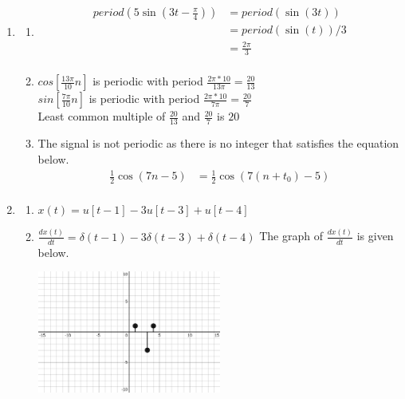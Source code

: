 \documentclass[10pt,a4paper, margin=1in]{article}
\begin{document}
\begin{enumerate}
\begin{enumerate}
    
    \end{enumerate}

\item %
    \begin{enumerate}
    \item \begin{align*}
        period(5\sin(3t - \frac{\pi}{4})) & = period(\sin(3t)) \\
        & = period(\sin(t)) / 3 \\
        & = \frac{2\pi}{3} \\
    \end{align*}    
    \item $cos[\frac{13\pi}{10}n]$ is periodic with period $\frac{2\pi*10}{13\pi} = \frac{20}{13}$ \\
    $sin[\frac{7\pi}{10}n]$ is periodic with period $\frac{2\pi*10}{7\pi} = \frac{20}{7}$ \\
    Least common multiple of $\frac{20}{13}$ and $\frac{20}{7}$ is $20$ \\
	\item The signal is not periodic as there is no integer that satisfies the equation below.
    \begin{align*}
        \frac{1}{2}\cos(7n - 5) & = \frac{1}{2}\cos(7(n + t_0) - 5) \\
    \end{align*}
    \end{enumerate}

\item %
    \begin{enumerate}
    \item $x(t) = u[t-1] - 3u[t-3] + u[t-4]$
    \newpage %
    \item $\frac{dx(t)}{dt} = \delta(t-1) -3\delta(t-3) +\delta(t-4)$
        The graph of $\frac{dx(t)}{dt}$ is given below.
        \begin{center}
            \includegraphics*[width=0.5\textwidth]{assets/graphs/q5b.png}
        \end{center}
    \end{enumerate}    
    

\end{enumerate}
\end{document}
